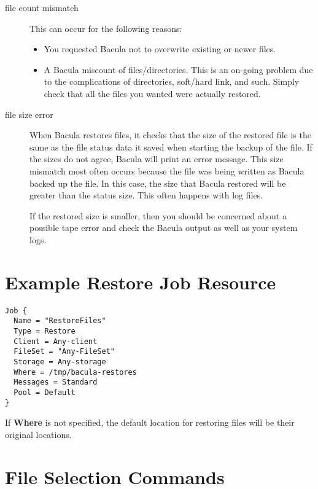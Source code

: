 \begin{description}

\item [file count mismatch]
  This can occur for the following reasons:
  \begin{itemize}
  \item You requested Bacula not to overwrite existing or newer
     files.
  \item A Bacula miscount of files/directories. This is an
     on-going problem due to the complications of directories,
     soft/hard link, and such.  Simply check that all the files you
     wanted were actually restored.
  \end{itemize}

\item [file size error]
   When Bacula restores files, it checks that the size of the
   restored file is the same as the file status data it saved 
   when starting the backup of the file. If the sizes do not
   agree, Bacula will print an error message. This size mismatch
   most often occurs because the file was being written as Bacula
   backed up the file. In this case, the size that Bacula
   restored will be greater than the status size.  This often
   happens with log files.

   If the restored size is smaller, then you should be concerned
   about a possible tape error and check the Bacula output as
   well as your system logs.
\end{description}



\section{Example Restore Job Resource}

\footnotesize
\begin{verbatim}
Job {
  Name = "RestoreFiles"
  Type = Restore
  Client = Any-client
  FileSet = "Any-FileSet"
  Storage = Any-storage
  Where = /tmp/bacula-restores
  Messages = Standard
  Pool = Default
}
\end{verbatim}
\normalsize

If {\bf Where} is not specified, the default location for restoring files will
be their original locations. 
\label{Selection}

\section{File Selection Commands}

